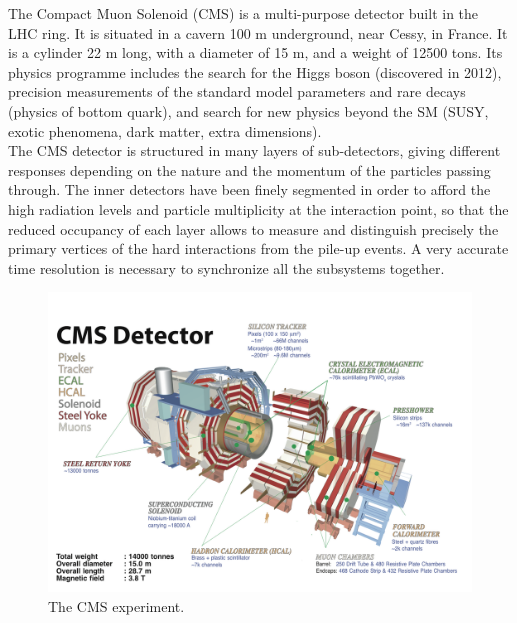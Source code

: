 The Compact Muon Solenoid (CMS) is a multi-purpose detector built in the LHC ring. It is situated in a cavern 100 m underground, near Cessy, in France. It is a cylinder 22 m long, with a diameter of 15 m, and a weight of 12500 tons. Its physics programme includes the search for the Higgs boson (discovered in 2012), precision measurements of the standard model parameters and rare decays (physics of bottom quark), and search for new physics beyond the SM (SUSY, exotic phenomena, dark matter, extra dimensions).\\
The CMS detector is structured in many layers of sub-detectors, giving different responses depending on the nature and the momentum of the particles passing through. The inner detectors have been finely segmented in order to afford the high radiation levels and particle multiplicity at the interaction point, so that the reduced occupancy of each layer allows to measure and distinguish precisely the primary vertices of the hard interactions from the pile-up events. A very accurate time resolution is necessary to synchronize all the subsystems together.\\

\begin{figure}[!htb]
  \centering
    \includegraphics[width=.99\textwidth]{figures/cms_3d.png}
  \caption{The CMS experiment.}
  \label{fig:CMS_1}
\end{figure}

